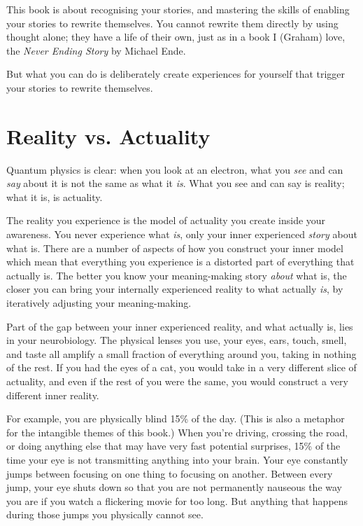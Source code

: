 This book is about recognising your stories, and mastering the skills of enabling your stories to rewrite themselves. You cannot rewrite them directly by using thought alone; they have a life of their own, just as in a book I (Graham) love, the \emph{Never Ending Story}\cite{ende-never} by Michael Ende. 


But what you can do is deliberately create experiences for yourself that trigger your stories to rewrite themselves.


\section{Reality vs. Actuality}
\label{section:reality-meaningness}


Quantum physics is clear: when you look at an electron, what you \emph{see} and can \emph{say} about it is not the same as what it \emph{is}. What you see and can say is reality; what it is, is actuality.


The reality you experience is the model of actuality you create inside your awareness. You never experience what \emph{is}, only your inner experienced \emph{story} about what is. There are a number of aspects of how you construct your inner model which mean that everything you experience is a distorted part of everything that actually is. The better you know your meaning-making story \emph{about} what is, the closer you can bring your internally experienced reality to what actually \emph{is}, by iteratively adjusting your meaning-making. 


Part of the gap between your inner experienced reality, and what actually is, lies in your neurobiology. The physical lenses you use, your eyes, ears, touch, smell, and taste all amplify a small fraction of everything around you, taking in nothing of the rest. If you had the eyes of a cat, you would take in a very different slice of actuality, and even if the rest of you were the same, you would construct a very different inner reality.


For example, you are physically blind 15\% of the day. (This is also a metaphor for the intangible themes of this book.) When you're driving, crossing the road, or doing anything else that may have very fast potential surprises, 15\% of the time your eye is not transmitting anything into your brain. Your eye constantly jumps between focusing on one thing to focusing on another. Between every jump, your eye shuts down so that you are not permanently nauseous the way you are if you watch a flickering movie for too long. But anything that happens during those jumps you physically cannot see.


